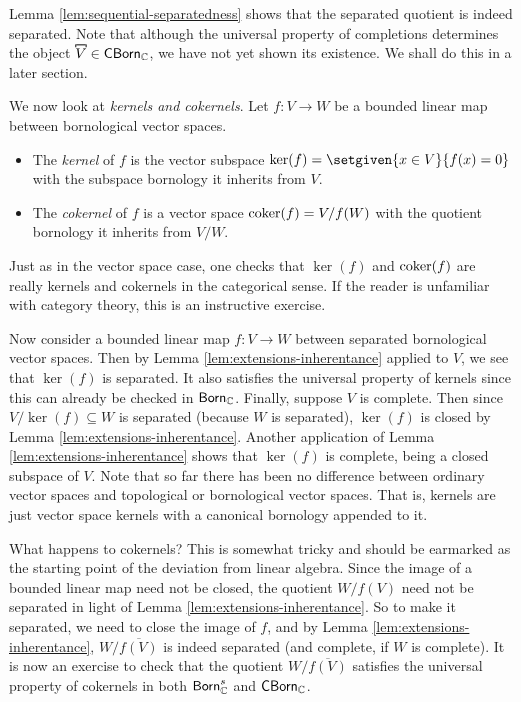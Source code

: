 Lemma \ref{lem:sequential-separatedness} shows that the separated quotient is indeed separated. Note that although the universal property of completions determines the object \(\comb{V} \in \mathsf{CBorn}_\C\), we have not yet shown its existence. We shall do this in a later section. 

We now look at \textit{kernels and cokernels}. Let \(f \colon V \to W\) be a bounded linear map between bornological vector spaces. 

\begin{itemize}
    \item The \textit{kernel} of \(f\) is the vector subspace \(\ker(f) = \setgiven{x \in V}{f(x) = 0}\) with the subspace bornology it inherits from \(V\).
    \item The \textit{cokernel} of \(f\) is a vector space \(\operatorname{coker}(f) = V/f(W)\) with the quotient bornology it inherits from \(V/W\).  
\end{itemize}

Just as in the vector space case, one checks that \(\ker(f)\) and \(\operatorname{coker}(f)\) are really kernels and cokernels in the categorical sense. If the reader is unfamiliar with category theory, this is an instructive exercise. 

Now consider a bounded linear map \(f \colon V \to W\) between separated bornological vector spaces. Then by Lemma \ref{lem:extensions-inherentance} applied to \(V\), we see that \(\ker(f)\) is separated. It also satisfies the universal property of kernels since this can already be checked in \(\mathsf{Born}_\mathbb C\). Finally, suppose \(V\) is complete. Then since \(V/\ker(f) \subseteq W\) is separated (because \(W\) is separated), \(\ker(f)\) is closed by Lemma \ref{lem:extensions-inherentance}. Another application of Lemma \ref{lem:extensions-inherentance} shows that \(\ker(f)\) is complete, being a closed subspace of \(V\).  Note that so far there has been no difference between ordinary vector spaces and topological or bornological vector spaces. That is, kernels are just vector space kernels with a canonical bornology appended to it.


What happens to cokernels? This is somewhat tricky and should be earmarked as the starting point of the deviation from linear algebra. Since the image of a bounded linear map need not be closed, the quotient \(W/f(V)\) need not be separated in light of Lemma \ref{lem:extensions-inherentance}. So to make it separated, we need to close the image of \(f\), and by Lemma \ref{lem:extensions-inherentance}, \(W/\overline{f(V)}\) is indeed separated (and complete, if \(W\) is complete). It is now an exercise to check that the quotient \(W/\overline{f(V)}\) satisfies the universal property of cokernels in both \(\mathsf{Born}_{\mathbb C}^s\) and \(\mathsf{CBorn}_{\mathbb C}\). 

